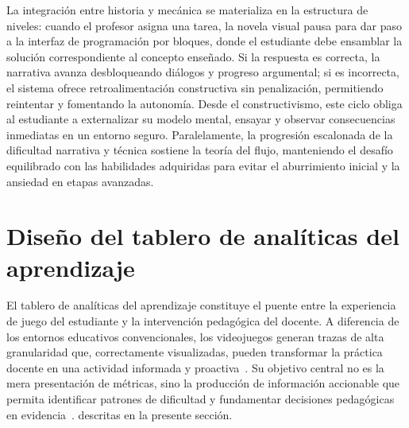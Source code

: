 La integración entre historia y mecánica se materializa en la estructura de niveles: cuando el profesor asigna una tarea, la novela visual pausa para dar paso a la interfaz de programación por bloques, donde el estudiante debe ensamblar la solución correspondiente al concepto enseñado. Si la respuesta es correcta, la narrativa avanza desbloqueando diálogos y progreso argumental; si es incorrecta, el sistema ofrece retroalimentación constructiva sin penalización, permitiendo reintentar y fomentando la autonomía. Desde el constructivismo, este ciclo obliga al estudiante a externalizar su modelo mental, ensayar y observar consecuencias inmediatas en un entorno seguro. Paralelamente, la progresión escalonada de la dificultad narrativa y técnica sostiene la teoría del flujo, manteniendo el desafío equilibrado con las habilidades adquiridas para evitar el aburrimiento inicial y la ansiedad en etapas avanzadas.

\section{Diseño del tablero de analíticas del aprendizaje}

%

El tablero de analíticas del aprendizaje constituye el puente entre la
experiencia de juego del estudiante y la intervención pedagógica del docente.
A diferencia de los entornos educativos convencionales, los videojuegos generan
trazas de alta granularidad que, correctamente visualizadas, pueden transformar
la práctica docente en una actividad informada y proactiva~\cite{rahimi2021learning}.
Su objetivo central no es la mera presentación de métricas, sino la producción
de información accionable que permita identificar patrones de dificultad y
fundamentar decisiones pedagógicas en evidencia~\cite{susnjak_learning_2022}.
descritas en la presente sección.

